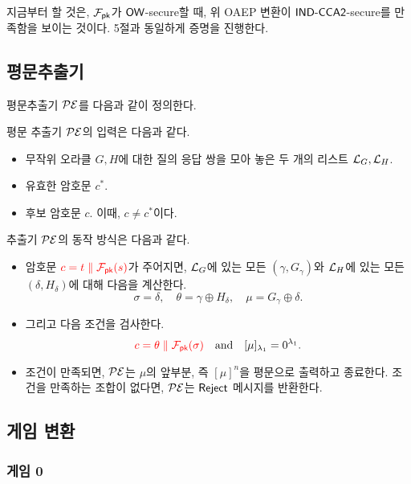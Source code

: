 지금부터 할 것은, $\mathcal{F}_{\textsf{pk}}$가 $\textsf{OW}$-secure할 때, 위 OAEP 변환이
$\textsf{IND-CCA2}$-secure를 만족함을 보이는 것이다. 5절과 동일하게 증명을 진행한다.

\newpage
\subsection{평문추출기}

평문추출기 $\mathcal{PE}$를 다음과 같이 정의한다.

\begin{tcolorbox}
	평문 추출기 $\mathcal{PE}$의 입력은 다음과 같다.
	\begin{itemize}
		\item 무작위 오라클 $G, H$에 대한 질의 응답 쌍을 모아 놓은 두 개의
		리스트 $\mathcal{L}_G, \mathcal{L}_H$.
		\item 유효한 암호문 $c^*$.
		\item 후보 암호문 $c$. 이때, $c \ne c^*$이다.
	\end{itemize}
	추출기 $\mathcal{PE}$의 동작 방식은 다음과 같다.
	\begin{itemize}
		\item 암호문 $\textcolor{red}{c = t \parallel \mathcal{F}_{\textsf{pk}}(s)}$가 주어지면, $\mathcal{L}_G$에 있는 모든
		$(\gamma, G_\gamma)$와 $\mathcal{L}_H$에 있는 모든 $(\delta, H_\delta)$에 대해
		다음을 계산한다. 
		$$
			\sigma = \delta, \quad 
			\theta = \gamma \oplus H_\delta, \quad 
			\mu = G_\gamma \oplus \delta.
		$$
		\item 그리고 다음 조건을 검사한다.
		$$
			\textcolor{red}{c = \theta \parallel \mathcal{F}_{\textsf{pk}}(\sigma)} \quad \text{and} \quad 
			[\mu]_{\lambda_1} = 0^{\lambda_1}.
		$$
		\item 조건이 만족되면, $\mathcal{PE}$는 $\mu$의 앞부분, 즉 $[\mu]^n$을 평문으로
		출력하고 종료한다. 조건을 만족하는 조합이 없다면, $\mathcal{PE}$는 $\textsf{Reject}$
		메시지를 반환한다.
	\end{itemize}
\end{tcolorbox}

\newpage
\subsection{게임 변환}
\subsubsection{게임 0}

